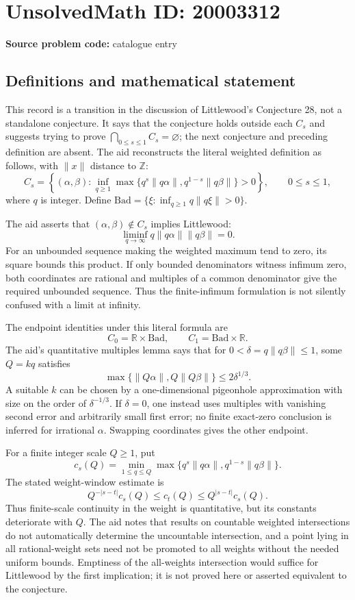 \documentclass[11pt]{article}
\newcommand{\Z}{\mathbb{Z}}
\newcommand{\R}{\mathbb{R}}
\begin{document}
\section*{UnsolvedMath ID: 20003312}
\textbf{Source problem code:} catalogue entry
\subsection{Definitions and mathematical statement}
This record is a transition in the discussion of Littlewood's Conjecture 28, not a standalone conjecture. It says that the conjecture holds outside each $C_s$ and suggests trying to prove $\bigcap_{0\leq s\leq1}C_s=\varnothing$; the next conjecture and preceding definition are absent. The aid reconstructs the literal weighted definition as follows, with $\|x\|$ distance to $\Z$:
\[
C_s=\left\{(\alpha,\beta):\inf_{q\geq1}
\max\{q^s\|q\alpha\|,q^{1-s}\|q\beta\|\}>0\right\},\qquad0\leq s\leq1,
\]
where $q$ is integer. Define $\mathrm{Bad}=\{\xi:\inf_{q\geq1}q\|q\xi\|>0\}$.

The aid asserts that $(\alpha,\beta)\notin C_s$ implies Littlewood:
\[
\liminf_{q\to\infty}q\|q\alpha\|\|q\beta\|=0.
\]
For an unbounded sequence making the weighted maximum tend to zero, its square bounds this product. If only bounded denominators witness infimum zero, both coordinates are rational and multiples of a common denominator give the required unbounded sequence. Thus the finite-infimum formulation is not silently confused with a limit at infinity.

The endpoint identities under this literal formula are
\[
C_0=\R\times\mathrm{Bad},\qquad C_1=\mathrm{Bad}\times\R.
\]
The aid's quantitative multiples lemma says that for $0<\delta=q\|q\beta\|\leq1$, some $Q=kq$ satisfies
\[
\max\{\|Q\alpha\|,Q\|Q\beta\|\}\leq2\delta^{1/3}.
\]
A suitable $k$ can be chosen by a one-dimensional pigeonhole approximation with size on the order of $\delta^{-1/3}$. If $\delta=0$, one instead uses multiples with vanishing second error and arbitrarily small first error; no finite exact-zero conclusion is inferred for irrational $\alpha$. Swapping coordinates gives the other endpoint.

For a finite integer scale $Q\geq1$, put
\[
c_s(Q)=\min_{1\leq q\leq Q}\max\{q^s\|q\alpha\|,q^{1-s}\|q\beta\|\}.
\]
The stated weight-window estimate is
\[
Q^{-|s-t|}c_s(Q)\leq c_t(Q)\leq Q^{|s-t|}c_s(Q).
\]
Thus finite-scale continuity in the weight is quantitative, but its constants deteriorate with $Q$. The aid notes that results on countable weighted intersections do not automatically determine the uncountable intersection, and a point lying in all rational-weight sets need not be promoted to all weights without the needed uniform bounds. Emptiness of the all-weights intersection would suffice for Littlewood by the first implication; it is not proved here or asserted equivalent to the conjecture.
\end{document}
